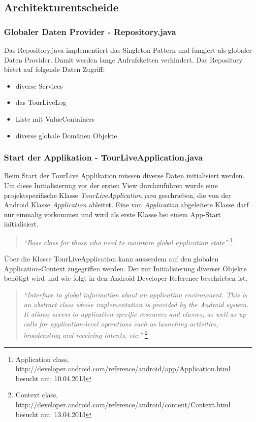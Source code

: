 \subsection{Architekturentscheide}

\subsubsection{Globaler Daten Provider - Repository.java}
Das Repository.java implementiert das Singleton-Pattern und fungiert als globaler Daten Provider. Damit werden lange Aufrufsketten verhindert. Das Repository bietet auf folgende Daten Zugriff:

\begin{itemize} [noitemsep,topsep=0pt]
	\item diverse Services
	\item das TourLiveLog
	\item Liste mit ValueContainers
	\item diverse globale Domänen Objekte
\end{itemize}

\subsubsection{Start der Applikation - TourLiveApplication.java}
Beim Start der TourLive Applikation müssen diverse Daten initialisiert werden. Um diese Initialisierung vor der ersten View durchzuführen wurde eine projektspezifische Klasse \textit{TourLiveApplication.java} geschrieben, die von der Android Klasse \textit{Application} ableitet. Eine von \textit{Application} abgeleitete Klasse darf nur einmalig vorkommen und wird als erste Klasse bei einem App-Start initialisiert.
\begin{quotation}
\textit{``Base class for those who need to maintain global application state''}.\footnote{Application class, \url{http://developer.android.com/reference/android/app/Application.html} besucht am: 10.04.2013}
\end{quotation}
Über die Klasse TourLiveApplication kann ausserdem auf den globalen Application-Context zugegriffen werden. Der zur Initialisierung diverser Objekte benötigt wird und wie folgt in den Android Developer Reference beschrieben ist.
\begin{quotation}
\textit{``Interface to global information about an application environment. This is an abstract class whose implementation is provided by the Android system. It allows access to application-specific resources and classes, as well as up-calls for application-level operations such as launching activities, broadcasting and receiving intents, etc.'' }\footnote{Context class, \url{http://developer.android.com/reference/android/content/Context.html} besucht am: 13.04.2013}
\end{quotation}

